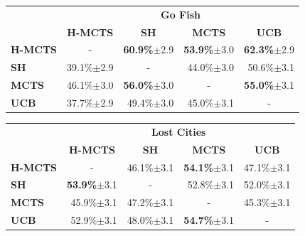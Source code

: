 \documentclass[a4paper]{llncs}
\begin{document}
\begin{table}[ht]
\centering
\setlength{\tabcolsep}{10pt}

\begin{tabular}{@{}lrrrr@{}}
\toprule
& \multicolumn{4}{c}{\textbf{Go Fish}} \\
& \multicolumn{1}{c}{\textbf{H-MCTS}} & \multicolumn{1}{c}{\textbf{SH}} & \multicolumn{1}{c}{\textbf{MCTS}} & \multicolumn{1}{c}{\textbf{UCB}} \\[1mm] \cmidrule(l){2-5} 
\textbf{H-MCTS} & \multicolumn{1}{c}{-}		& \textbf{60.9\%}$\pm$2.9 	& \textbf{53.9\%}$\pm$3.0 	& \textbf{62.3\%}$\pm$2.9 	\\[.5mm] 
\textbf{SH}     & 39.1\%$\pm$2.9 			& \multicolumn{1}{c}{-} 	& 44.0\%$\pm$3.0 			& 50.6\%$\pm$3.1 			\\[.5mm] 
\textbf{MCTS}   & 46.1\%$\pm$3.0 			& \textbf{56.0\%}$\pm$3.0 	& \multicolumn{1}{c}{-} 	& \textbf{55.0\%}$\pm$3.1 	\\[.5mm]
\textbf{UCB}	& 37.7\%$\pm$2.9			& 49.4\%$\pm$3.0 			& 45.0\%$\pm$3.1 			& \multicolumn{1}{c}{-} 	\\[.5mm] 
\end{tabular}

\begin{tabular}{@{}lrrrr@{}}
\toprule
& \multicolumn{4}{c}{\textbf{Lost Cities}} \\
& \multicolumn{1}{c}{\textbf{H-MCTS}} & \multicolumn{1}{c}{\textbf{SH}} & \multicolumn{1}{c}{\textbf{MCTS}} & \multicolumn{1}{c}{\textbf{UCB}} \\ [1mm] \cmidrule(l){2-5} 
\textbf{H-MCTS} & \multicolumn{1}{c}{-}		& 46.1\%$\pm$3.1 			& \textbf{54.1\%}$\pm$3.1  	& 47.1\%$\pm$3.1 			\\[.5mm] 
\textbf{SH}     & \textbf{53.9\%}$\pm$3.1 	& \multicolumn{1}{c}{-} 	& 52.8\%$\pm$3.1  			& 52.0\%$\pm$3.1  			\\[.5mm] 
\textbf{MCTS}   & 45.9\%$\pm$3.1		 	& 47.2\%$\pm$3.1  			& \multicolumn{1}{c}{-} 	& 45.3\%$\pm$3.1  			\\[.5mm]
\textbf{UCB}	& 52.9\%$\pm$3.1			& 48.0\%$\pm$3.1  			& \textbf{54.7\%}$\pm$3.1 	& \multicolumn{1}{c}{-} 	\\[.5mm]
\end{tabular}


\end{table}
\end{document}
